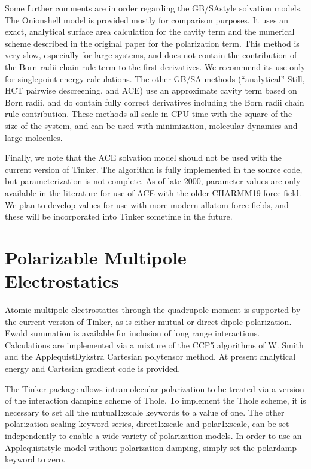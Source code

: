 \documentclass[letterpaper,11pt,english]{sphinxmanual}
\begin{document}
Some further comments are in order regarding the GB/SA\sphinxhyphen{}style solvation models. The Onion\sphinxhyphen{}shell model is provided mostly for comparison purposes. It uses an exact, analytical surface area calculation for the cavity term and the numerical scheme described in the original paper for the polarization term. This method is very slow, especially for large systems, and does not contain the contribution of the Born radii chain rule term to the first derivatives. We recommend its use only for single\sphinxhyphen{}point energy calculations. The other GB/SA methods (“analytical” Still, H\sphinxhyphen{}C\sphinxhyphen{}T pairwise descreening, and ACE) use an approximate cavity term based on Born radii, and do contain fully correct derivatives including the Born radii chain rule contribution. These methods all scale in CPU time with the square of the size of the system, and can be used with minimization, molecular dynamics and large molecules.

Finally, we note that the ACE solvation model should not be used with the current version of Tinker. The algorithm is fully implemented in the source code, but parameterization is not complete. As of late 2000, parameter values are only available in the literature for use of ACE with the older CHARMM19 force field. We plan to develop values for use with more modern all\sphinxhyphen{}atom force fields, and these will be incorporated into Tinker sometime in the future.


\section{Polarizable Multipole Electrostatics}
\label{\detokenize{text/special-features:polarizable-multipole-electrostatics}}
Atomic multipole electrostatics through the quadrupole moment is supported by the current version of Tinker, as is either mutual or direct dipole polarization. Ewald summation is available for inclusion of long range interactions. Calculations are implemented via a mixture of the CCP5 algorithms of W. Smith and the Applequist\sphinxhyphen{}Dykstra Cartesian polytensor method. At present analytical energy and Cartesian gradient code is provided.

The Tinker package allows intramolecular polarization to be treated via a version of the interaction damping scheme of Thole. To implement the Thole scheme, it is necessary to set all the mutual\sphinxhyphen{}1x\sphinxhyphen{}scale keywords to a value of one. The other polarization scaling keyword series, direct\sphinxhyphen{}1x\sphinxhyphen{}scale and polar\sphinxhyphen{}1x\sphinxhyphen{}scale, can be set independently to enable a wide variety of polarization models. In order to use an Applequist\sphinxhyphen{}style model without polarization damping, simply set the polar\sphinxhyphen{}damp keyword to zero.
\end{document}
